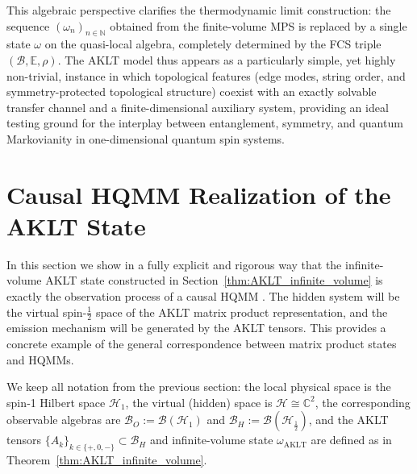 \documentclass[11pt,a4paper]{article}
\begin{document}
This algebraic perspective clarifies the thermodynamic limit construction: the sequence $(\omega_n)_{n\in\mathbb{N}}$ obtained from the finite-volume MPS is replaced by a single state $\omega$ on the quasi-local algebra, completely determined by the FCS triple $(\mathcal{B},\mathbb{E},\rho)$. The AKLT model thus appears as a particularly simple, yet highly non-trivial, instance in which topological features (edge modes, string order, and symmetry-protected topological structure) coexist with an exactly solvable transfer channel and a finite-dimensional auxiliary system, providing an ideal testing ground for the interplay between entanglement, symmetry, and quantum Markovianity in one-dimensional quantum spin systems.


\section{Causal HQMM Realization of the AKLT State}\label{sec:HQMM_AKLT}

In this section we show in a fully explicit and rigorous way that the infinite-volume AKLT state constructed in Section~\ref{thm:AKLT_infinite_volume} is exactly the observation process of a causal  HQMM . The hidden system will be the virtual spin-\(\tfrac12\) space of the AKLT matrix product representation, and the emission mechanism will be generated by the AKLT tensors. This provides a concrete example of the general correspondence between matrix product states and HQMMs.

We keep all notation from the previous section: the local physical space is the spin‑1 Hilbert space \(\mathcal{H}_{1}\), the virtual (hidden) space is \(\mathcal{H}\cong\mathbb{C}^2\), the corresponding observable algebras are \(\mathcal{B}_O:=\mathcal{B}(\mathcal{H}_{1})\) and \(\mathcal{B}_H:=\mathcal{B}(\mathcal{H}_{\frac{1}{2}})\), and the AKLT tensors \(\{A_k\}_{k\in\{+,0,-\}}\subset\mathcal{B}_H\) and infinite-volume state \(\omega_{\mathrm{AKLT}}\) are defined as in Theorem~\ref{thm:AKLT_infinite_volume}.
\end{document}
